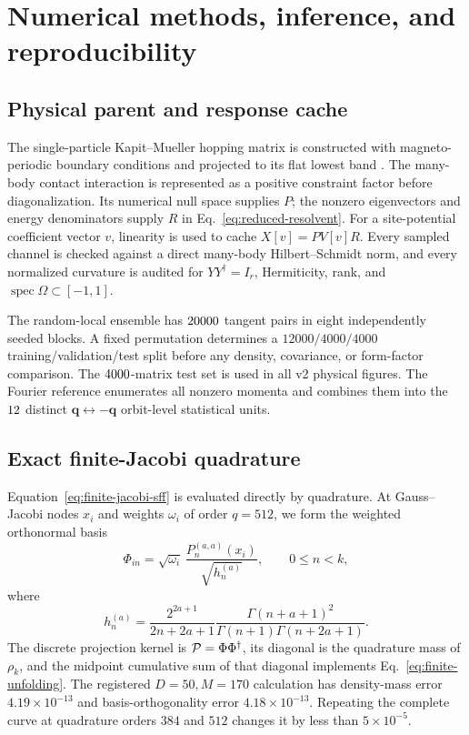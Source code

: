 \section{Numerical methods, inference, and reproducibility}
\label{app:numerics}

\subsection{Physical parent and response cache}

The single-particle Kapit--Mueller hopping matrix is constructed with
magneto-periodic boundary conditions and projected to its flat lowest band
\cite{kapitmueller2010}.
The many-body contact interaction is represented as a positive constraint
factor before diagonalization.
Its numerical null space supplies \(P\); the nonzero eigenvectors and energy
denominators supply \(R\) in Eq.~\eqref{eq:reduced-resolvent}.
For a site-potential coefficient vector \(v\), linearity is used to cache
\(X[v]=PV[v]R\).
Every sampled channel is checked against a direct many-body
Hilbert--Schmidt norm, and every normalized curvature is audited for
\(YY^\dagger=I_r\), Hermiticity, rank, and
\(\operatorname{spec}\Omega\subset[-1,1]\).

The random-local ensemble has \(20000\) tangent pairs in eight
independently seeded blocks.
A fixed permutation determines a \(12000/4000/4000\)
training/validation/test split before any density, covariance, or form-factor
comparison.
The \(4000\)-matrix test set is used in all v2 physical
figures.
The Fourier reference enumerates all nonzero momenta and combines them into
the \(12\) distinct \(\bm q\leftrightarrow-\bm q\) orbit-level
statistical units.

\subsection{Exact finite-Jacobi quadrature}

Equation~\eqref{eq:finite-jacobi-sff} is evaluated directly by quadrature.
At Gauss--Jacobi nodes \(x_i\) and weights \(\omega_i\) of order \(q=512\),
we form the weighted orthonormal basis
\begin{equation}
 \Phi_{in}=\sqrt{\omega_i}\,
 \frac{P_n^{(a,a)}(x_i)}{\sqrt{h_n^{(a)}}},
 \qquad 0\leq n<k ,
 \label{eq:quadrature-basis}
\end{equation}
where
\begin{equation}
 h_n^{(a)}
 =\frac{2^{2a+1}}{2n+2a+1}
 \frac{\Gamma(n+a+1)^2}{\Gamma(n+1)\Gamma(n+2a+1)} .
 \label{eq:jacobi-norm}
\end{equation}
The discrete projection kernel is \({\cal P}=\Phi\Phi^\dagger\), its diagonal
is the quadrature mass of \(\rho_k\), and the midpoint cumulative sum of that
diagonal implements Eq.~\eqref{eq:finite-unfolding}.
The registered \(D=50,M=170\) calculation has density-mass error
\(4.19\times10^{-13}\) and basis-orthogonality error
\(4.18\times10^{-13}\).
Repeating the complete curve at quadrature orders \(384\) and \(512\) changes
it by less than \(5\times10^{-5}\).

